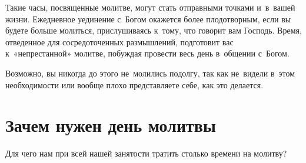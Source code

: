\documentclass[12pt,article,a4paper,fittopage]{ncc}
\begin{document}
\begin{multicols}{2}
Такие часы, посвященные молитве, могут стать отправными точками и~в~вашей жизни. Ежедневное уединение с~Богом окажется более плодотворным, если вы будете больше молиться, прислушиваясь к~тому, что говорит вам Господь. Время, отведенное для сосредоточенных размышлений, подготовит вас к~«непрестанной» молитве, побуждая провести весь день в~общении с~Богом.

Возможно, вы никогда до этого не~молились подолгу, так как не~видели в~этом необходимости или вообще плохо представляете себе, как это делается.

\pagestyle{lheadings}
\section*{Зачем нужен день молитвы}

Для чего нам при всей нашей занятости тратить столько времени на молитву?


\end{multicols}
\end{document}

